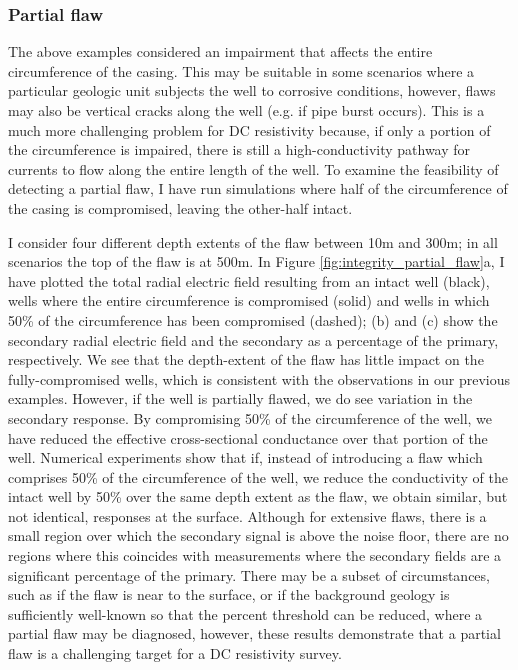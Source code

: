 





\subsubsection{Partial flaw}
The above examples considered an impairment that affects the entire circumference of the casing. This may be suitable in some scenarios where a particular geologic unit subjects the well to corrosive conditions, however, flaws may also be vertical cracks along the well (e.g. if pipe burst occurs). This is a much more challenging problem for DC resistivity because, if only a portion of the circumference is impaired, there is still a high-conductivity pathway for currents to flow along the entire length of the well. To examine the feasibility of detecting a partial flaw, I have run simulations where half of the circumference of the casing is compromised, leaving the other-half intact.

I consider four different depth extents of the flaw between 10m and 300m; in all scenarios the top of the flaw is at 500m. In Figure \ref{fig:integrity_partial_flaw}a, I have plotted the total radial electric field resulting from an intact well (black), wells where the entire circumference is compromised (solid) and wells in which 50\% of the circumference has been compromised (dashed); (b) and (c) show the secondary radial electric field and the secondary as a percentage of the primary, respectively. We see that the depth-extent of the flaw has little impact on the fully-compromised wells, which is consistent with the observations in our previous examples. However, if the well is partially flawed, we do see variation in the secondary response. By compromising 50\% of the circumference of the well, we have reduced the effective cross-sectional conductance over that portion of the well. Numerical experiments show that if, instead of introducing a flaw which comprises 50\% of the circumference of the well, we reduce the conductivity of the intact well by 50\% over the same depth extent as the flaw, we obtain similar, but not identical, responses at the surface. Although for extensive flaws, there is a small region over which the secondary signal is above the noise floor, there are no regions where this coincides with measurements where the secondary fields are a significant percentage of the primary. There may be a subset of circumstances, such as if the flaw is near to the surface, or if the background geology is sufficiently well-known so that the percent threshold can be reduced, where a partial flaw may be diagnosed, however, these results demonstrate that a partial flaw is a challenging target for a DC resistivity survey.


